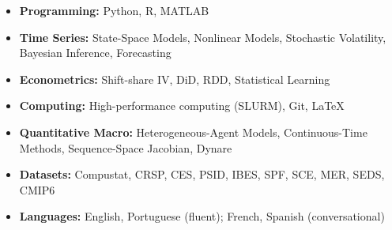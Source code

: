 \documentclass{practical-resume}
\begin{document}
\vspace{-0.4em}

\noindent
\begin{minipage}[t]{0.48\textwidth}
\begin{itemize}[leftmargin=*, itemsep=0em, topsep=0.3em]
    \item \textbf{Programming:} Python, R, MATLAB
    \item \textbf{Time Series:} State-Space Models, Nonlinear Models, Stochastic Volatility, Bayesian Inference, Forecasting
    \item \textbf{Econometrics:} Shift-share IV, DiD, RDD, Statistical Learning
    \item \textbf{Computing:} High-performance computing (SLURM), Git, \LaTeX
\end{itemize}
\end{minipage}%
\hfill%
\begin{minipage}[t]{0.48\textwidth}
\begin{itemize}[leftmargin=0.25em, itemsep=0.25em, topsep=0.3em]
    \item \textbf{Quantitative Macro:} Heterogeneous-Agent Models, Continuous-Time Methods, Sequence-Space Jacobian, Dynare
    \item \textbf{Datasets:} Compustat, CRSP, CES, PSID, IBES, SPF, SCE, MER, SEDS, CMIP6
    \item \textbf{Languages:} English, Portuguese (fluent); French, Spanish (conversational)
\end{itemize}
\end{minipage}


		
\end{document}

